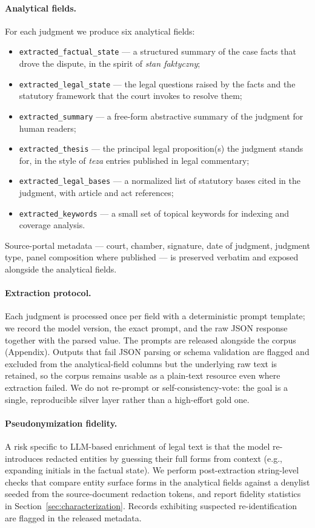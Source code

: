 \documentclass{article}
\begin{document}
\paragraph{Analytical fields.} For each judgment we produce six analytical fields:
\begin{itemize}
    \item \texttt{extracted\_factual\_state} --- a structured summary of the case facts that drove the dispute, in the spirit of \emph{stan faktyczny};
    \item \texttt{extracted\_legal\_state} --- the legal questions raised by the facts and the statutory framework that the court invokes to resolve them;
    \item \texttt{extracted\_summary} --- a free-form abstractive summary of the judgment for human readers;
    \item \texttt{extracted\_thesis} --- the principal legal proposition(s) the judgment stands for, in the style of \emph{teza} entries published in legal commentary;
    \item \texttt{extracted\_legal\_bases} --- a normalized list of statutory bases cited in the judgment, with article and act references;
    \item \texttt{extracted\_keywords} --- a small set of topical keywords for indexing and coverage analysis.
\end{itemize}
Source-portal metadata --- court, chamber, signature, date of judgment, judgment type, panel composition where published --- is preserved verbatim and exposed alongside the analytical fields.

\paragraph{Extraction protocol.} Each judgment is processed once per field with a deterministic prompt template; we record the model version, the exact prompt, and the raw JSON response together with the parsed value. The prompts are released alongside the corpus (Appendix). Outputs that fail JSON parsing or schema validation are flagged and excluded from the analytical-field columns but the underlying raw text is retained, so the corpus remains usable as a plain-text resource even where extraction failed. We do not re-prompt or self-consistency-vote: the goal is a single, reproducible silver layer rather than a high-effort gold one.

\paragraph{Pseudonymization fidelity.} A risk specific to LLM-based enrichment of legal text is that the model re-introduces redacted entities by guessing their full forms from context (e.g., expanding initials in the factual state). We perform post-extraction string-level checks that compare entity surface forms in the analytical fields against a denylist seeded from the source-document redaction tokens, and report fidelity statistics in Section~\ref{sec:characterization}. Records exhibiting suspected re-identification are flagged in the released metadata.
\end{document}
